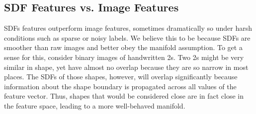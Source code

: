 \documentclass[anon,11pt]{9520} %
\begin{document}
\subsection{SDF Features vs. Image Features}
SDFs features outperform image features, sometimes dramatically so under harsh
conditions such as sparse or noisy labels. We believe this to be because SDFs
are smoother than raw images and better obey the manifold assumption. To get a
sense for this, consider binary images of handwritten 2s. Two 2s might be very
similar in shape, yet have almost no overlap because they are so narrow in most
places. The SDFs of those shapes, however, will overlap significantly because
information about the shape boundary is propagated across all values of the
feature vector. Thus, shapes that would be considered close are in fact close in
the feature space, leading to a more well-behaved manifold.


\end{document}
